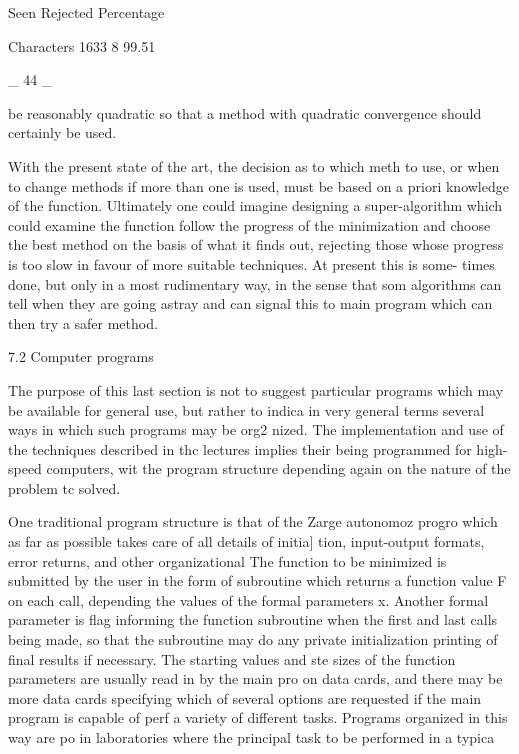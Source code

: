                  Seen Rejected  Percentage
 
Characters       1633        8   99.51
 
                               _ 44 _
 
 
be reasonably quadratic so that a method with quadratic convergence
should certainly be used.
 
     With the present state of the art, the decision as to which meth
to use, or when to change methods if more than one is used, must be
based on a priori knowledge of the function.  Ultimately one could
imagine designing a super-algorithm which could examine the function
follow the progress of the minimization and choose the best method on
the basis of what it finds out, rejecting those whose progress is too
slow in favour of more suitable techniques.  At present this is some-
times done, but only in a most rudimentary way, in the sense that som
algorithms can tell when they are going astray and can signal this to
main program which can then try a safer method.
 
 
7.2  Computer programs
 
     The purpose of this last section is not to suggest particular
programs which may be available for general use, but rather to indica
in very general terms several ways in which such programs may be org2
nized.  The implementation and use of the techniques described in thc
lectures implies their being programmed for high-speed computers, wit
the program structure depending again on the nature of the problem tc
solved.
 
     One traditional program structure is that of the Zarge autonomoz
progro which as far as possible takes care of all details of initia]
tion, input-output formats, error returns, and other organizational
The function to be minimized is submitted by the user in the form of
subroutine which returns a function value F on each call, depending
the values of the formal parameters x.  Another formal parameter is
flag informing the function subroutine when the first and last calls
being made, so that the subroutine may do any private initialization
printing of final results if necessary.  The starting values and ste
sizes of the function parameters are usually read in by the main pro
on data cards, and there may be more data cards specifying which of
several options are requested if the main program is capable of perf
a variety of different tasks.  Programs organized in this way are po
in laboratories where the principal task to be performed in a typica
 
